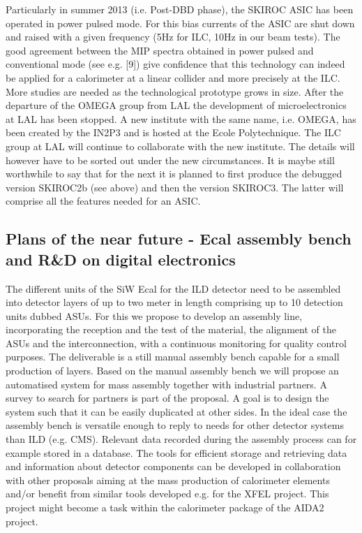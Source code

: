 Particularly in summer 2013 (i.e. Post-DBD phase), the SKIROC ASIC has been operated in power pulsed mode. For this bias currents of the ASIC are shut down and raised with a given frequency (5Hz for ILC, 10Hz in our beam tests). The good agreement between the MIP spectra obtained in power pulsed and conventional mode (see e.g. [9]) give confidence that this technology can indeed be applied for a calorimeter at a linear collider and more precisely at the ILC. More studies are needed as the technological prototype grows in size.
After the departure of the OMEGA group from LAL the development of microelectronics at LAL has been stopped. A new institute with the same name, i.e. OMEGA, has been created by the IN2P3 and is hosted at the Ecole Polytechnique. The ILC group at LAL will continue to collaborate with the new institute. The details will however have to be sorted out under the new circumstances. It is maybe still worthwhile to say that for the next it is planned to first produce the debugged version SKIROC2b (see above) and then the version SKIROC3. The latter will comprise all the features needed for an ASIC.
\subsection{Plans of the near future - Ecal assembly bench and R\&D on digital electronics}
The different units of the SiW Ecal for the ILD detector need to be assembled into detector layers of up to two meter in length comprising up to 10 detection units dubbed ASUs. For this we propose to develop an assembly line, incorporating the reception and the test of the material, the alignment of the ASUs and the interconnection, with a continuous monitoring for quality control purposes. The deliverable is a still manual assembly bench capable for a small production of layers. Based on the manual assembly bench we will propose an automatised system for mass assembly together with industrial partners. A survey to search for partners is part of the proposal. A goal is to design the system such that it can be easily duplicated at other sides. In the ideal case the assembly bench is versatile enough to reply to needs for other detector systems than ILD (e.g. CMS). Relevant data recorded during the assembly process can for example stored in a database. The tools for efficient storage and retrieving data and information about detector components can be developed in collaboration with other proposals aiming at the mass production of calorimeter elements and/or benefit from similar tools developed e.g. for the XFEL project. This project might become a task within the calorimeter package of the AIDA2 project.

